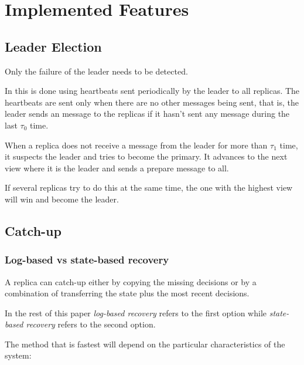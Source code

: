 \chapter{Implemented Features}

\section{Leader Election}
\label{sec:leader_election}
\indent\par
Only the failure of the leader needs to be detected.

In \paxosJava this is done using heartbeats sent periodically by the leader to all replicas.
The heartbeats are sent only when there are no other messages being sent, that is, the leader sends an \alive message to the replicas if it hasn't sent any message during the last $\tau_0$ time.

When a replica does not receive a message from the leader for more than $\tau_1$ time, it suspects the leader and tries to become the primary. It advances to the next view where it is the leader and sends a prepare message to all.

If several replicas try to do this at the same time, the one with the highest view will win and become the leader.


\section{Catch-up}
\label{sec:catch_up}

\subsection{Log-based vs state-based recovery}
\label{subsec:log_based_state_based_recovery}
A replica can catch-up either by copying the missing decisions or by a combination of transferring the state plus the most recent decisions.

In the rest of this paper \emph{log-based recovery} refers to the first option while \emph{state-based recovery} refers to the second option.

The method that is fastest will depend on the particular characteristics of the system:

